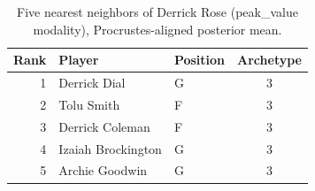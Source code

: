 \begin{table}[htbp]
  \centering\small
  \begin{tabular}{rllc}
    \toprule
    Rank & Player & Position & Archetype \\
    \midrule
    1 & Derrick Dial & G & 3 \\
    2 & Tolu Smith & F & 3 \\
    3 & Derrick Coleman & F & 3 \\
    4 & Izaiah Brockington & G & 3 \\
    5 & Archie Goodwin & G & 3 \\
    \bottomrule
  \end{tabular}
  \caption{Five nearest neighbors of Derrick Rose (peak_value modality), Procrustes-aligned posterior mean.}
  \label{tab:Derrick_Rose_neighbors_peak_value}
\end{table}

